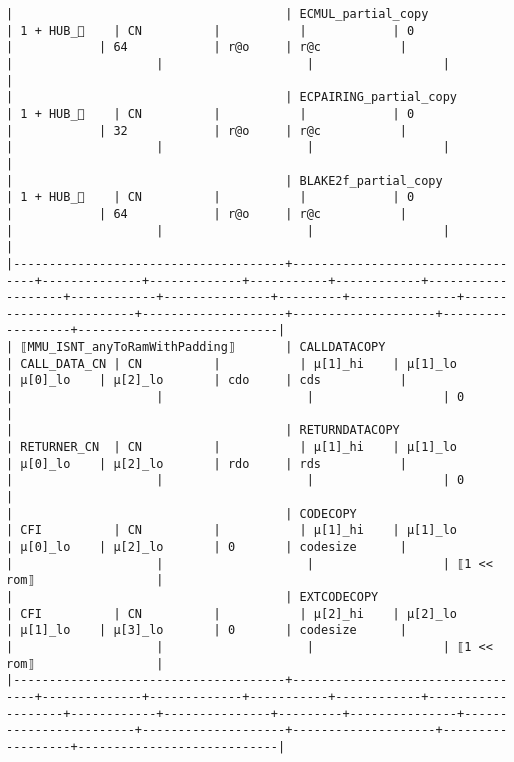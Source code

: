 \documentclass[varwidth=\maxdimen,margin=0.5cm,multi={verbatim}]{standalone}
\begin{document}
\begin{verbatim}
|                                      | ECMUL_partial_copy               | 1 + HUB_    | CN          |           |            | 0                 |            | 64            | r@o     | r@c           |                        |                    |                    |                  |                            |
|                                      | ECPAIRING_partial_copy           | 1 + HUB_    | CN          |           |            | 0                 |            | 32            | r@o     | r@c           |                        |                    |                    |                  |                            |
|                                      | BLAKE2f_partial_copy             | 1 + HUB_    | CN          |           |            | 0                 |            | 64            | r@o     | r@c           |                        |                    |                    |                  |                            |
|--------------------------------------+----------------------------------+--------------+-------------+-----------+------------+-------------------+------------+---------------+---------+---------------+------------------------+--------------------+--------------------+------------------+----------------------------|
| ⟦MMU_ISNT_anyToRamWithPadding⟧       | CALLDATACOPY                     | CALL_DATA_CN | CN          |           | µ[1]_hi    | µ[1]_lo           | µ[0]_lo    | µ[2]_lo       | cdo     | cds           |                        |                    |                    |                  | 0                          |
|                                      | RETURNDATACOPY                   | RETURNER_CN  | CN          |           | µ[1]_hi    | µ[1]_lo           | µ[0]_lo    | µ[2]_lo       | rdo     | rds           |                        |                    |                    |                  | 0                          |
|                                      | CODECOPY                         | CFI          | CN          |           | µ[1]_hi    | µ[1]_lo           | µ[0]_lo    | µ[2]_lo       | 0       | codesize      |                        |                    |                    |                  | ⟦1 << rom⟧                 |
|                                      | EXTCODECOPY                      | CFI          | CN          |           | µ[2]_hi    | µ[2]_lo           | µ[1]_lo    | µ[3]_lo       | 0       | codesize      |                        |                    |                    |                  | ⟦1 << rom⟧                 |
|--------------------------------------+----------------------------------+--------------+-------------+-----------+------------+-------------------+------------+---------------+---------+---------------+------------------------+--------------------+--------------------+------------------+----------------------------|

\end{verbatim}
\end{document}
